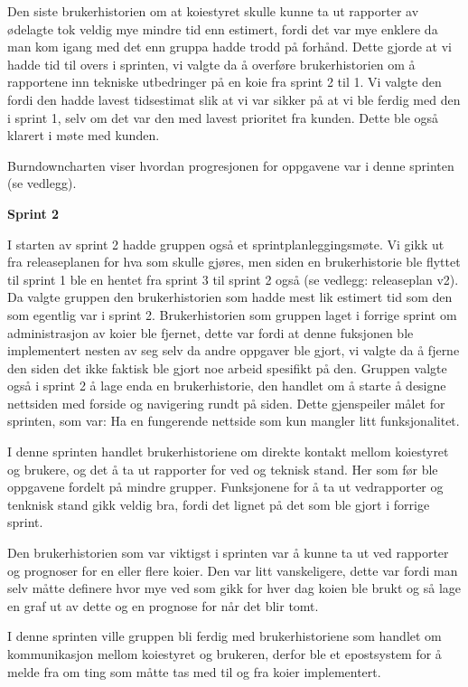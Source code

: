 \documentclass[12pt,a4paper,norsk]{article}
\begin{document}
Den siste brukerhistorien om at koiestyret skulle kunne ta ut rapporter av ødelagte tok veldig mye mindre tid enn estimert, fordi det var mye enklere da man kom igang med det enn gruppa hadde trodd på forhånd. Dette gjorde at vi hadde tid til overs i sprinten, vi valgte da å overføre brukerhistorien om å rapportene inn tekniske utbedringer på en koie fra sprint 2 til 1.  Vi valgte den fordi den hadde lavest tidsestimat slik at vi var sikker på at vi ble ferdig med den i sprint 1, selv om det var den med lavest prioritet fra kunden. Dette ble også klarert i møte med kunden. 

Burndowncharten viser hvordan progresjonen for oppgavene var i denne sprinten (se vedlegg).

\bigskip \noindent \textbf{Sprint 2}
\par I starten av sprint 2 hadde gruppen også et sprintplanleggingsmøte. Vi gikk ut fra releaseplanen for hva som skulle gjøres, men siden en brukerhistorie ble flyttet til sprint 1 ble en hentet fra sprint 3 til sprint 2 også (se vedlegg: releaseplan v2). Da valgte gruppen den brukerhistorien som hadde mest lik estimert tid som den som egentlig var i sprint 2. Brukerhistorien som gruppen laget i forrige sprint om administrasjon av koier ble fjernet, dette var fordi at denne fuksjonen ble implementert nesten av seg selv da andre oppgaver ble gjort, vi valgte da å fjerne den siden det ikke faktisk ble gjort noe arbeid spesifikt på den. Gruppen valgte også i sprint 2 å lage enda en brukerhistorie, den handlet om å starte å designe nettsiden med forside og navigering rundt på siden. Dette gjenspeiler målet for sprinten, som var: Ha en fungerende nettside som kun mangler litt funksjonalitet.

I denne sprinten handlet brukerhistoriene om direkte kontakt mellom koiestyret og brukere, og det å ta ut rapporter for ved og teknisk stand. Her som før ble oppgavene fordelt på mindre grupper. Funksjonene for å ta ut vedrapporter og tenknisk stand gikk veldig bra, fordi det lignet på det som ble gjort i forrige sprint.

Den brukerhistorien som var viktigst i sprinten var å kunne ta ut ved rapporter og prognoser for en eller flere koier. Den var litt vanskeligere, dette var fordi man selv måtte definere hvor mye ved som gikk for hver dag koien ble brukt og så lage en graf ut av dette og en prognose for når det blir tomt. 

I denne sprinten ville gruppen bli ferdig med brukerhistoriene som handlet om kommunikasjon mellom koiestyret og brukeren, derfor ble et epostsystem for å melde fra om ting som måtte tas med til og fra koier implementert. 
\end{document}
